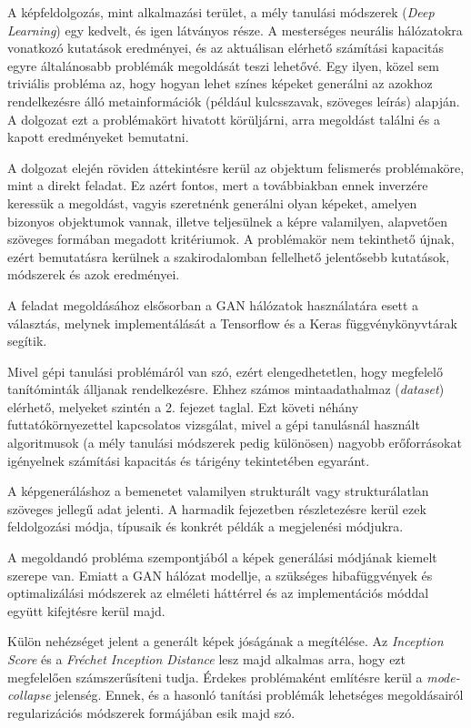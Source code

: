 
A képfeldolgozás, mint alkalmazási terület, a mély tanulási módszerek (\textit{Deep Learning}) egy kedvelt, és igen látványos része.
A mesterséges neurális hálózatokra vonatkozó kutatások eredményei, és az aktuálisan elérhető számítási kapacitás egyre általánosabb problémák megoldását teszi lehetővé.
Egy ilyen, közel sem triviális probléma az, hogy hogyan lehet színes képeket generálni az azokhoz rendelkezésre álló metainformációk (például kulcsszavak, szöveges leírás) alapján.
A dolgozat ezt a problémakört hivatott körüljárni, arra megoldást találni és a kapott eredményeket bemutatni.

A dolgozat elején röviden áttekintésre kerül az objektum felismerés problémaköre, mint a direkt feladat. Ez azért fontos, mert a továbbiakban ennek inverzére keressük a megoldást, vagyis szeretnénk generálni olyan képeket, amelyen bizonyos objektumok vannak, illetve teljesülnek a képre valamilyen, alapvetően szöveges formában megadott kritériumok. A problémakör nem tekinthető újnak, ezért bemutatásra kerülnek a szakirodalomban fellelhető jelentősebb kutatások, módszerek és azok eredményei.

A feladat megoldásához elsősorban a GAN hálózatok használatára esett a választás, melynek implementálását a Tensorflow és a Keras függvénykönyvtárak segítik.

Mivel gépi tanulási problémáról van szó, ezért elengedhetetlen, hogy megfelelő tanítóminták álljanak rendelkezésre. Ehhez számos mintaadathalmaz (\textit{dataset}) elérhető, melyeket szintén a 2. fejezet taglal. Ezt követi néhány futtatókörnyezettel kapcsolatos vizsgálat, mivel a gépi tanulásnál használt algoritmusok (a mély tanulási módszerek pedig különösen) nagyobb erőforrásokat igényelnek számítási kapacitás és tárigény tekintetében egyaránt.

A képgeneráláshoz a bemenetet valamilyen strukturált vagy strukturálatlan szöveges jellegű adat jelenti. A harmadik fejezetben részletezésre kerül ezek feldolgozási módja, típusaik és konkrét példák a megjelenési módjukra.

A megoldandó probléma szempontjából a képek generálási módjának kiemelt szerepe van. Emiatt a GAN hálózat modellje, a szükséges hibafüggvények és optimalizálási módszerek az elméleti háttérrel és az implementációs móddal együtt kifejtésre kerül majd.

Külön nehézséget jelent a generált képek jóságának a megítélése. Az \textit{Inception Score} és a \textit{Fréchet Inception Distance} lesz majd alkalmas arra, hogy ezt megfelelően számszerűsíteni tudja. Érdekes problémaként említésre kerül a \textit{mode-collapse} jelenség. Ennek, és a hasonló tanítási problémák lehetséges megoldásairól regularizációs módszerek formájában esik majd szó.

